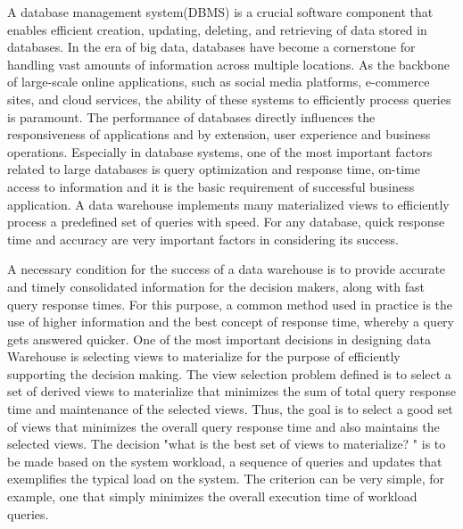 A database management system(DBMS) is a crucial software component that enables efficient creation, updating, deleting, and retrieving of data stored in databases. In the era of big data, databases have become a cornerstone for handling vast amounts of information across multiple locations. As the backbone of large-scale online applications, such as social media platforms, e-commerce sites, and cloud services, the ability of these systems to efficiently process queries is paramount. The performance of databases directly influences the responsiveness of applications and by extension, user experience and business operations.\cite{4} Especially in database systems, one of the most important factors related to large databases is query  optimization and response time, on-time access to information and it is the basic requirement of successful business application. A data warehouse implements many materialized views to efficiently process a predefined set of queries with speed. For any database, quick response time and accuracy are very important factors in considering its success.\cite{karde2010selection}\vspace{.4cm} 

A necessary condition for the success of a data warehouse is to provide accurate and timely consolidated information for the decision makers, along with fast query response times. For this purpose, a common method used in practice is the use of higher information and the best concept of response time, whereby a query gets answered quicker. One of the most important decisions in designing data Warehouse is selecting views to materialize for the purpose of efficiently supporting the decision making. The view selection problem defined is to select a set of derived views to materialize that minimizes the sum of total query response time  and  maintenance of the selected views. Thus, the goal is to select a good set of views that minimizes the overall query response time and also maintains the selected views. The decision "what is the best set of views to materialize? " is to be made based on the system workload, a sequence of queries and updates that exemplifies the typical load on the system. The criterion can be very simple, for example, one that simply minimizes the overall execution time of workload queries.\vspace{.4cm}

